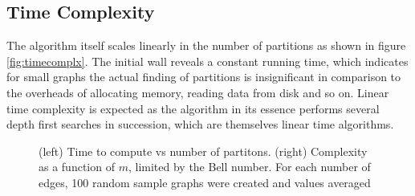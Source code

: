 \clearpage
\subsection{Time Complexity}
The algorithm itself scales linearly in the number of partitions as shown in figure \ref{fig:timecomplx}.  The initial wall reveals a constant running time, which indicates for small graphs the actual finding of partitions is insignificant in comparison to the overheads of allocating memory, reading data from disk and so on.  Linear time complexity is expected as the algorithm in its essence performs several depth first searches in succession, which are themselves linear time algorithms.

\begin{figure}[h]
  \centering
  \caption[Complexity as a function of $m$]%
  {(left) Time to compute vs number of partitons.  (right) Complexity as a function of $m$, limited by the Bell number. For each number of edges,
  100 random sample graphs were created and values averaged}
\end{figure}